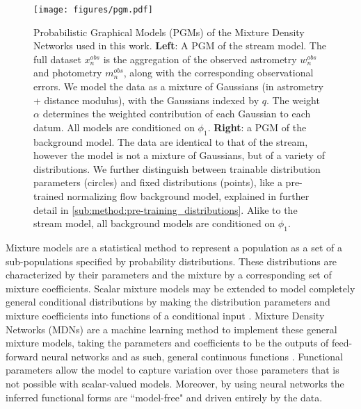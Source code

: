 \documentclass[twocolumn]{aastex631}
\begin{document}
        \begin{figure*}
            \centering
            \texttt{[image: figures/pgm.pdf]}
            \caption{%
                Probabilistic Graphical Models (PGMs) of the Mixture Density
                Networks used in this work.
                \textbf{Left}: A PGM of the stream model. The full dataset
                $x_n^{obs}$ is the aggregation of the observed astrometry
                $w_n^{obs}$ and photometry $m_n^{obs}$, along with the
                corresponding observational errors. We model the data as a
                mixture of Gaussians (in astrometry + distance modulus), with
                the Gaussians indexed by $q$. The weight $\alpha$ determines the
                weighted contribution of each Gaussian to each datum. All models
                are conditioned on $\phi_1$.
                \textbf{Right}: a PGM of the background model. The data are
                identical to that of the stream, however the model is not a
                mixture of Gaussians, but of a variety of distributions. We
                further distinguish between trainable distribution parameters
                (circles) and fixed distributions (points), like a pre-trained
                normalizing flow background model, explained in further detail
                in \autoref{sub:method:pre-training_distributions}. Alike to the
                stream model, all background models are conditioned on $\phi_1$.
            }
            \label{fig:PGM}
        \end{figure*}

        Mixture models are a statistical method to represent a population as a
        set of a sub-populations specified by probability distributions.  These
        distributions are characterized by their parameters and the mixture by a
        corresponding set of mixture coefficients. Scalar mixture models may be
        extended to model completely general conditional distributions by making
        the distribution parameters and mixture coefficients into functions of a
        conditional input \citep{McLachlanBasford1989}.  Mixture Density
        Networks (MDNs) are a machine learning method to implement these general
        mixture models, taking the parameters and coefficients to be the outputs
        of feed-forward neural networks and as such, general continuous
        functions \citep{Bishop1994}.  Functional parameters allow the model to
        capture variation over those parameters that is not possible with
        scalar-valued models. Moreover, by using neural networks the inferred
        functional forms are ``model-free" and driven entirely by the data.
\end{document}
